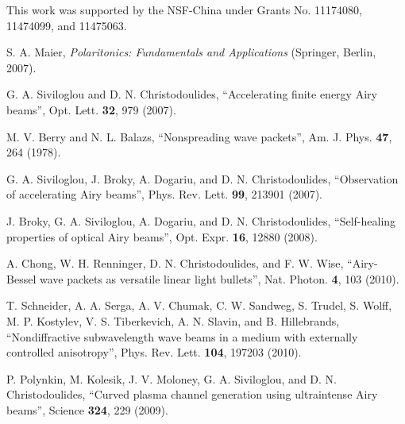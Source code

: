 \documentclass[aps,pra,preprint,groupedaddress,amsmath,amssymb,showpacs]{revtex4-1}
\begin{document}
\vskip 0.95cm

This work was supported by the NSF-China under Grants No. 11174080, 11474099, and 11475063.

\begin{references}

 S. A. Maier, {\it Polaritonics: Fundamentals and Applications} (Springer, Berlin, 2007).

\vskip 0.7cm

 G. A. Siviloglou and D. N. Christodoulides,
``Accelerating finite energy Airy beams'',
Opt. Lett. {\bf 32}, 979 (2007).

\vskip 0.7cm

 M. V. Berry and N. L. Balazs,
``Nonspreading wave packets'',
Am. J. Phys. {\bf 47}, 264 (1978).

\vskip 0.7cm


 G. A. Siviloglou, J. Broky, A. Dogariu, and D. N. Christodoulides,
``Observation of accelerating Airy beams'',
Phys. Rev. Lett. {\bf 99}, 213901 (2007).

\vskip 0.7cm

 J. Broky, G. A. Siviloglou, A. Dogariu, and D. N. Christodoulides,
``Self-healing properties of optical Airy beams'',
Opt. Expr. {\bf 16}, 12880 (2008).

\vskip 0.7cm

 A. Chong, W. H. Renninger, D. N. Christodoulides, and F. W. Wise,
``Airy-Bessel wave packets as versatile linear light bullets'',
Nat. Photon. {\bf 4}, 103 (2010).

\vskip 0.7cm


 T. Schneider, A. A. Serga, A. V. Chumak, C. W. Sandweg, S. Trudel, S. Wolff, M. P. Kostylev, V. S. Tiberkevich, A. N. Slavin, and B. Hillebrands,
``Nondiffractive subwavelength wave beams in a medium with externally controlled anisotropy'',
Phys. Rev. Lett. {\bf 104}, 197203 (2010).

\vskip 0.7cm


 P. Polynkin, M. Kolesik, J. V. Moloney, G. A. Siviloglou, and D. N. Christodoulides,
``Curved plasma channel generation using ultraintense Airy beams'',
Science {\bf 324}, 229 (2009).

\vskip 0.7cm


\end{references}
\end{document}

